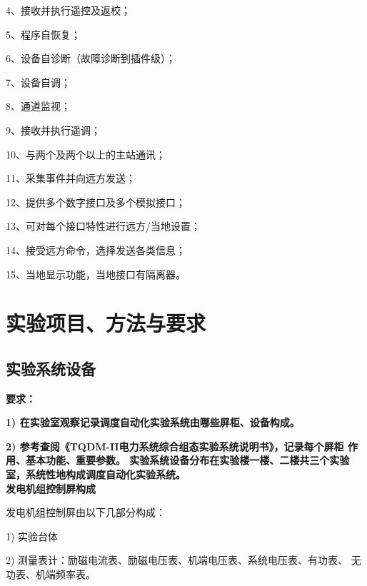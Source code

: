 \documentclass[a4paper]{ctexrep}
\begin{document}
                4、接收并执行遥控及返校； 
                
                5、程序自恢复； 
                
                6、设备自诊断（故障诊断到插件级）； 
                
                7、设备自调； 
                
                8、通道监视； 
                
                9、接收并执行遥调； 
                
                10、与两个及两个以上的主站通讯； 
                
                11、采集事件并向远方发送； 
                
                12、提供多个数字接口及多个模拟接口； 
                
                13、可对每个接口特性进行远方/当地设置； 
                
                14、接受远方命令，选择发送各类信息； 
                
                15、当地显示功能，当地接口有隔离器。

            \section{实验项目、方法与要求}
                \subsection{实验系统设备}
                    \textbf{要求： }
                   
                    \textbf{1) 在实验室观察记录调度自动化实验系统由哪些屏柜、设备构成。}
                    
                    \textbf{2) 参考查阅《TQDM-II电力系统综合组态实验系统说明书》，记录每个屏柜 作用、基本功能、重要参数。 实验系统设备分布在实验楼一楼、二楼共三个实验室，系统性地构成调度自动化实验系统。} \\

                    \textbf{发电机组控制屏构成}
                    
                    发电机组控制屏由以下几部分构成： 
                    
                    1) 实验台体 
                    
                    2) 测量表计：励磁电流表、励磁电压表、机端电压表、系统电压表、有功表、 无功表、机端频率表。 
                    
\end{document}
